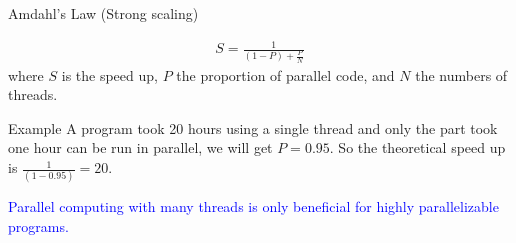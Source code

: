 \documentclass[12pt,t]{beamer}
\begin{document}
\begin{frame}{Amdahl's Law (Strong scaling)~\cite{amdahl1967validity}}

\begin{align*}
S = \frac{1}{(1-P) + \frac{P}{N}}
\end{align*}
where $S$ is the speed up, $P$ the proportion of parallel code, and $N$ the numbers of threads.

\begin{block}{Example}
A program took 20 hours using a single thread and only the part took one hour can be run in parallel, we will get $P=0.95$. So the theoretical speed up is $\frac{1}{(1-0.95)}=20$.
\end{block}
\begin{center}
\textcolor{blue}{Parallel computing with many threads is only beneficial for highly parallelizable programs.}
\end{center}

\end{frame}
\end{document}
